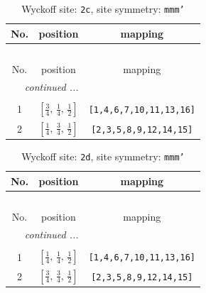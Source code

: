 \documentclass[fleqn,8pt]{jsarticle}
\begin{document}
\renewcommand{\arraystretch}{1.2}
\begin{longtable}{ccc}
\caption{Wyckoff site: {\tt 2c}, site symmetry: {\tt mmm'}}
 \\
 \hline \hline
No. & position & mapping \\ \hline \endfirsthead

\multicolumn{2}{l}{\tablename\ \thetable{}} \\
 \hline \hline
No. & position & mapping \\ \hline \endhead

 \hline \hline
\multicolumn{2}{r}{\footnotesize\it continued ...} \\ \endfoot

 \hline \hline
\multicolumn{2}{r}{} \\ \endlastfoot

1 & $\left[ \frac{3}{4},\, \frac{1}{4},\, \frac{1}{2} \right]$ & {\tt [1,4,6,7,10,11,13,16]} \\ \hline
2 & $\left[ \frac{1}{4},\, \frac{3}{4},\, \frac{1}{2} \right]$ & {\tt [2,3,5,8,9,12,14,15]} \\
\end{longtable}
\renewcommand{\arraystretch}{1.2}
\begin{longtable}{ccc}
\caption{Wyckoff site: {\tt 2d}, site symmetry: {\tt mmm'}}
 \\
 \hline \hline
No. & position & mapping \\ \hline \endfirsthead

\multicolumn{2}{l}{\tablename\ \thetable{}} \\
 \hline \hline
No. & position & mapping \\ \hline \endhead

 \hline \hline
\multicolumn{2}{r}{\footnotesize\it continued ...} \\ \endfoot

 \hline \hline
\multicolumn{2}{r}{} \\ \endlastfoot

1 & $\left[ \frac{1}{4},\, \frac{1}{4},\, \frac{1}{2} \right]$ & {\tt [1,4,6,7,10,11,13,16]} \\ \hline
2 & $\left[ \frac{3}{4},\, \frac{3}{4},\, \frac{1}{2} \right]$ & {\tt [2,3,5,8,9,12,14,15]} \\
\end{longtable}
\renewcommand{\arraystretch}{1.2}
\end{document}
